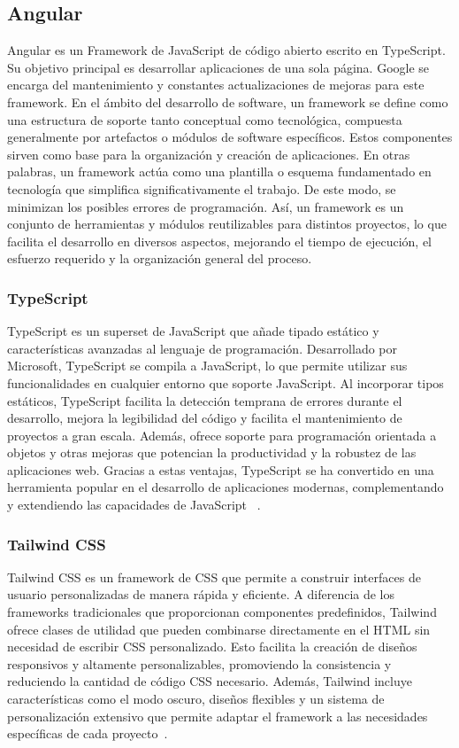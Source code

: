 \subsection{Angular}
Angular es un Framework de JavaScript de código abierto escrito en TypeScript. Su objetivo principal es desarrollar aplicaciones de una sola página. Google se encarga del mantenimiento y constantes actualizaciones de mejoras para este framework.
En el ámbito del desarrollo de software, un framework se define como una estructura de soporte tanto conceptual como tecnológica, compuesta generalmente por artefactos o módulos de software específicos. Estos componentes sirven como base para la organización y creación de aplicaciones.
En otras palabras, un framework actúa como una plantilla o esquema fundamentado en tecnología que simplifica significativamente el trabajo. De este modo, se minimizan los posibles errores de programación.
Así, un framework es un conjunto de herramientas y módulos reutilizables para distintos proyectos, lo que facilita el desarrollo en diversos aspectos, mejorando el tiempo de ejecución, el esfuerzo requerido y la organización general del proceso.

\subsubsection{TypeScript}
TypeScript es un superset de JavaScript que añade tipado estático y características avanzadas al lenguaje de programación. Desarrollado por Microsoft, TypeScript se compila a JavaScript, lo que permite utilizar sus funcionalidades en cualquier entorno que soporte JavaScript. Al incorporar tipos estáticos, TypeScript facilita la detección temprana de errores durante el desarrollo, mejora la legibilidad del código y facilita el mantenimiento de proyectos a gran escala. Además, ofrece soporte para programación orientada a objetos y otras mejoras que potencian la productividad y la robustez de las aplicaciones web. Gracias a estas ventajas, TypeScript se ha convertido en una herramienta popular en el desarrollo de aplicaciones modernas, complementando y extendiendo las capacidades de JavaScript ~\cite{TypescriptDOCS}.


\subsubsection{Tailwind CSS}
Tailwind CSS es un framework de CSS  que permite a construir interfaces de usuario personalizadas de manera rápida y eficiente. A diferencia de los frameworks tradicionales que proporcionan componentes predefinidos, Tailwind ofrece clases de utilidad que pueden combinarse directamente en el HTML sin necesidad de escribir CSS personalizado. Esto facilita la creación de diseños responsivos y altamente personalizables, promoviendo la consistencia y reduciendo la cantidad de código CSS necesario. Además, Tailwind incluye características como el modo oscuro, diseños flexibles y un sistema de personalización extensivo que permite adaptar el framework a las necesidades específicas de cada proyecto~\cite{TailwindCSS}.

